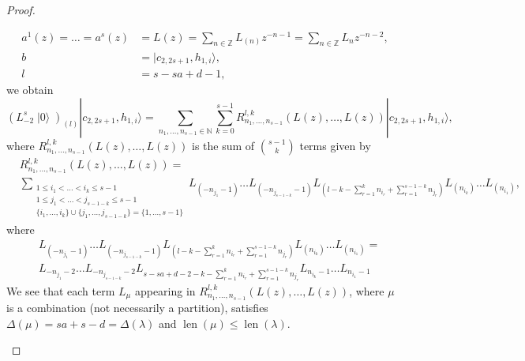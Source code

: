 \documentclass[a4paper, 12pt, reqno]{amsart}
\theoremstyle{remark}
\DeclareMathOperator{\len}{len}
\DeclareMathOperator{\vac}{|0\rangle}
\begin{document}
\begin{proof}
\begin{enumerate}
    \begin{align*}
      a^1(z) = \dots = a^s(z) &= L(z) = \sum_{n \in \mathbb{Z}}L_{(n)}z^{-n - 1} = \sum_{n \in \mathbb{Z}}L_nz^{-n - 2}, \\
      b &= |c_{2, 2s + 1}, h_{1, i}\rangle, \\
      l &= s - sa + d - 1,
    \end{align*}
    we obtain
    \begin{equation}
      \label{eq:9}
      (L_{-2}^s\vac)_{(l)}|c_{2, 2s + 1}, h_{1, i}\rangle = \sum_{n_1, \dots, n_{s - 1} \in \mathbb{N}}\sum_{k = 0}^{s - 1}R^{l, k}_{n_1, \dots, n_{s - 1}}(L(z), \dots, L(z))|c_{2, 2s + 1}, h_{1, i}\rangle,
    \end{equation}
    where $R^{l, k}_{n_1, \dots, n_{s - 1}}(L(z), \dots, L(z))$ is the sum of $\binom{s - 1}{k}$ terms given by
    \begin{align*}
      &R^{l, k}_{n_1, \dots, n_{s - 1}}(L(z), \dots, L(z)) = \\
      &\sum_{\substack{1 \le i_1 < \dots < i_k \le s - 1 \\ 1 \le j_1 < \dots < j_{s - 1 - k} \le s - 1 \\ \{i_1, \dots, i_k\} \cup \{j_1, \dots, j_{s - 1 - k}\} = \{1, \dots, s - 1\}}}L_{(-n_{j_1} - 1)}\dots L_{(-n_{j_{s - 1 - k}} - 1)}L_{(l - k - \sum_{r = 1}^kn_{i_r} + \sum_{r = 1}^{s - 1 - k}n_{j_r})}L_{(n_{i_k})}\dots L_{(n_{i_1})},
    \end{align*}
    where
    \begin{align*}
      &L_{(-n_{j_1} - 1)}\dots L_{(-n_{j_{s - 1 - k}} - 1)}L_{(l - k - \sum_{r = 1}^kn_{i_r} + \sum_{r = 1}^{s - 1 - k}n_{j_r})}L_{(n_{i_k})}\dots L_{(n_{i_1})} = \\
      &L_{-n_{j_1} - 2}\dots L_{-n_{j_{s - 1 - k}} - 2}L_{s - sa + d - 2 - k - \sum_{r = 1}^kn_{i_r} + \sum_{r = 1}^{s - 1 - k}n_{j_r}}L_{n_{i_k} - 1}\dots L_{n_{i_1} - 1}
    \end{align*}
    We see that each term $L_{\mu}$ appearing in $R^{l, k}_{n_1, \dots, n_{s - 1}}(L(z), \dots, L(z))$, where $\mu$ is a combination (not necessarily a partition), satisfies $\Delta(\mu) = sa + s - d = \Delta(\lambda)$ and $\len(\mu) \le \len(\lambda)$.


\end{enumerate}
\end{proof}
\end{document}

